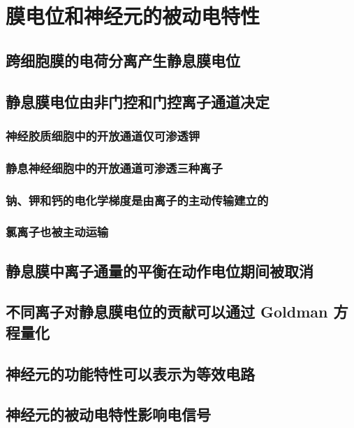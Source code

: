 \chapter{膜电位和神经元的被动电特性}


\section{跨细胞膜的电荷分离产生静息膜电位}

\section{静息膜电位由非门控和门控离子通道决定}
\subsection{神经胶质细胞中的开放通道仅可渗透钾}
\subsection{静息神经细胞中的开放通道可渗透三种离子}
\subsection{钠、钾和钙的电化学梯度是由离子的主动传输建立的}
\subsection{氯离子也被主动运输}

\section{静息膜中离子通量的平衡在动作电位期间被取消}

\section{不同离子对静息膜电位的贡献可以通过 Goldman 方程量化}

\section{神经元的功能特性可以表示为等效电路}

\section{神经元的被动电特性影响电信号}
